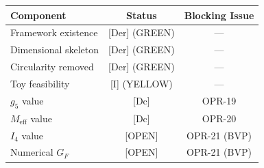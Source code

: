 \documentclass[11pt]{article}
\newcommand{\tagDer}{{\small\textsf{[Der]}}}
\newcommand{\tagDc}{{\small\textsf{[Dc]}}}
\newcommand{\tagI}{{\small\textsf{[I]}}}
\newcommand{\tagOPEN}{{\small\textsf{[OPEN]}}}
\begin{document}
\begin{center}
\begin{tabular}{lcc}
\toprule
\textbf{Component} & \textbf{Status} & \textbf{Blocking Issue} \\
\midrule
Framework existence & \tagDer{} (GREEN) & --- \\
Dimensional skeleton & \tagDer{} (GREEN) & --- \\
Circularity removed & \tagDer{} (GREEN) & --- \\
Toy feasibility & \tagI{} (YELLOW) & --- \\
$g_5$ value & \tagDc{} & OPR-19 \\
$M_{\text{eff}}$ value & \tagDc{} & OPR-20 \\
$I_4$ value & \tagOPEN{} & OPR-21 (BVP) \\
Numerical $G_F$ & \tagOPEN{} & OPR-21 (BVP) \\
\bottomrule
\end{tabular}
\end{center}
\end{document}
